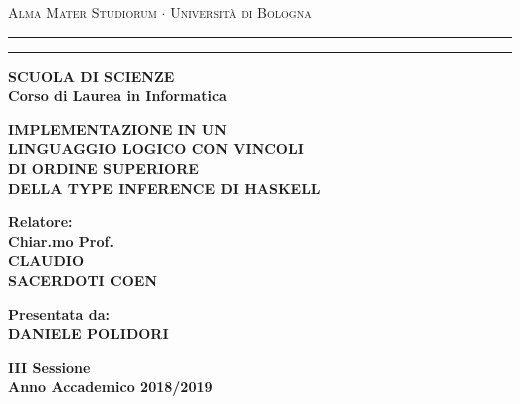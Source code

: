 \documentclass[12pt,a4paper]{report}
\begin{document}
\begin{titlepage}
\begin{center}
{{\Large{\textsc{Alma Mater Studiorum $\cdot$ Universit\`a di
Bologna}}}} \rule[0.1cm]{15.8cm}{0.1mm}
\rule[0.5cm]{15.8cm}{0.6mm}
{\small{\bf SCUOLA DI SCIENZE\\
Corso di Laurea in Informatica }}
\end{center}
\vspace{15mm}
\begin{center}
{\LARGE{\bf IMPLEMENTAZIONE IN UN}}\\
\vspace{3mm}
{\LARGE{\bf LINGUAGGIO LOGICO CON VINCOLI}}\\
\vspace{3mm}
{\LARGE{\bf DI ORDINE SUPERIORE}}\\
\vspace{3mm}
{\LARGE{\bf DELLA TYPE INFERENCE DI HASKELL}}\\
%
\end{center}
\vspace{40mm}
\par
\noindent
\begin{minipage}[t]{0.47\textwidth}
{\large{\bf Relatore:\\
Chiar.mo Prof.\\
CLAUDIO\\
SACERDOTI COEN}}
\end{minipage}
\hfill
\begin{minipage}[t]{0.47\textwidth}\raggedleft
{\large{\bf Presentata da:\\
DANIELE POLIDORI}}
\end{minipage}
\vspace{20mm}
\begin{center}
{\large{\bf III Sessione\\
Anno Accademico 2018/2019 }}
\end{center}
\clearpage{\pagestyle{empty}\cleardoublepage}%
\end{titlepage}
\end{document}
